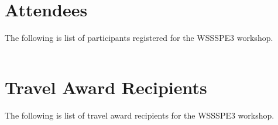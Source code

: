 \documentclass[11pt, oneside]{amsart}
\newcommand{\todo}[1]{{\color{blue}$\blacksquare$~\textsf{[TODO: #1]}}}
\begin{document}
{\scriptsize
\begin{longtable}{lll}

\end{longtable}
}
 

\section{Attendees}  \label{sec:attendees}
The following is list of participants registered for the WSSSPE3 workshop.

{\scriptsize
\begin{longtable}{lll}

\end{longtable}
}

\section{Travel Award Recipients}  \label{sec:awardees}
The following is list of travel award recipients for the WSSSPE3 workshop.

{\scriptsize
\begin{longtable}{lll}

\end{longtable}
}




%

%

%








\end{document}
